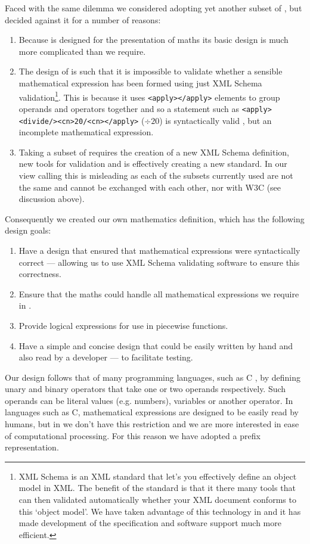 Faced with the same dilemma we considered adopting yet another subset
of \mathml, but decided against it for a number of reasons:
\begin{enumerate}
\item Because \mathml is designed for the presentation of maths its
  basic design is much more complicated than we require.
\item The design of \mathml is such that it is impossible to validate
  whether a sensible mathematical expression has been formed using
  just XML Schema validation\footnote{XML Schema is an XML standard
    that let's you effectively define an object model in XML. The
    benefit of the standard is that it there many tools that can then
    validated automatically whether your XML document conforms to this
    `object model'. We have taken advantage of this technology in
    \pharmml and it has made development of the specification and
    software support much more efficient.}. This is because it uses
  \verb|<apply></apply>| elements to group operands and operators
  together and so a statement such as
  \verb|<apply><divide/><cn>20/<cn></apply>| ($\div 20$) is
  syntactically valid \mathml, but an incomplete mathematical
  expression.
\item Taking a subset of \mathml requires the creation of a new XML
  Schema definition, new tools for validation and is effectively
  creating a new standard. In our view calling this \mathml is
  misleading as each of the \mathml subsets currently used are not the
  same and cannot be exchanged with each other, nor with W3C \mathml
  (see discussion above).
\end{enumerate}
Consequently we created our own mathematics definition, which has the
following design goals:
\begin{enumerate}
\item Have a design that ensured that mathematical expressions
  were syntactically correct --- allowing us to use XML Schema
  validating software to ensure this correctness.
\item Ensure that the maths could handle all mathematical expressions
  we require in \pharmml.
\item Provide logical expressions for use in piecewise functions.
\item Have a simple and concise design that could be easily written by hand
  and also read by a developer --- to facilitate testing.
\end{enumerate}

Our design follows that of many programming languages, such as C
\cite{Kernighan:1988:CPL:576122}, by defining unary and binary
operators that take one or two operands respectively. Such operands
can be literal values (e.g.\xspace numbers), variables or another
operator. In languages such as C, mathematical expressions are
designed to be easily read by humans, but in \pharmml we don't have
this restriction and we are more interested in ease of computational
processing. For this reason we have adopted a prefix representation.


